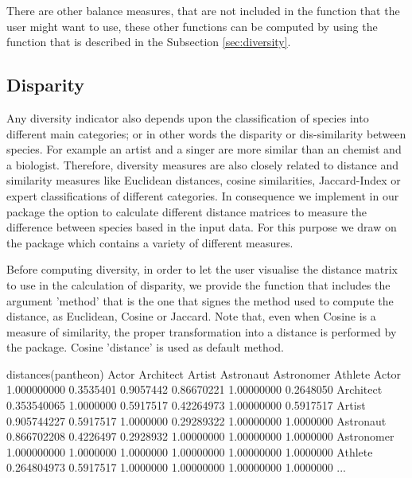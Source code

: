 There are other balance measures, that are not included in the function  that the user might want to use, these other functions can be computed by using the function  that is described in the Subsection \ref{sec:diversity}.


\subsection{Disparity}
Any diversity indicator also depends upon the classification of species into different main categories; or in other words the disparity or dis-similarity between species. For example an artist and a singer are more similar than an chemist and a biologist. Therefore, diversity measures are also closely related to distance and similarity measures like Euclidean distances, cosine similarities, Jaccard-Index or expert classifications of different categories. In consequence we implement in our package the option to calculate different distance matrices to measure the difference between species based in the input data. For this purpose we draw on the package  which contains a variety of different measures. 

Before computing diversity, in order to let the user visualise the distance matrix to use in the calculation of disparity, we provide the function  that includes the argument 'method' that is the one that signes the method used to compute the distance, as Euclidean, Cosine or Jaccard. Note that, even when Cosine is a measure of similarity, the proper transformation into a distance is performed by the  package. Cosine 'distance' is used as default method.

\begin{example}
 distances(pantheon)
                          Actor Architect    Artist  Astronaut Astronomer   Athlete
Actor               1.000000000 0.3535401 0.9057442 0.86670221 1.00000000 0.2648050
Architect           0.353540065 1.0000000 0.5917517 0.42264973 1.00000000 0.5917517
Artist              0.905744227 0.5917517 1.0000000 0.29289322 1.00000000 1.0000000
Astronaut           0.866702208 0.4226497 0.2928932 1.00000000 1.00000000 1.0000000
Astronomer          1.000000000 1.0000000 1.0000000 1.00000000 1.00000000 1.0000000
Athlete             0.264804973 0.5917517 1.0000000 1.00000000 1.00000000 1.0000000
...
\end{example}

